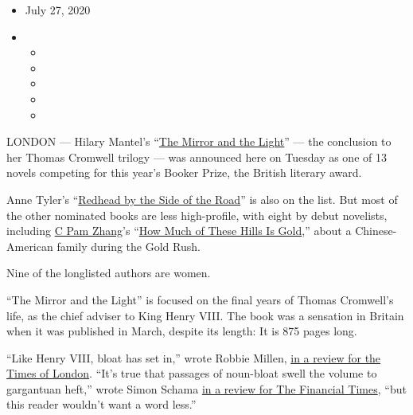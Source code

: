 \begin{itemize}
\item
  July 27, 2020
\item
  \begin{itemize}
  \item
  \item
  \item
  \item
  \item
  \end{itemize}
\end{itemize}

LONDON --- Hilary Mantel's
``\href{https://www.nytimes.com/2020/03/03/books/review-mirror-light-hilary-mantel.html}{The
Mirror and the Light}'' --- the conclusion to her Thomas Cromwell
trilogy --- was announced here on Tuesday as one of 13 novels competing
for this year's Booker Prize, the British literary award.

Anne Tyler's
``\href{https://www.nytimes.com/2020/04/07/books/review/redhead-by-the-side-of-the-road-anne-tyler.html}{Redhead
by the Side of the Road}'' is also on the list. But most of the other
nominated books are less high-profile, with eight by debut novelists,
including
\href{https://www.nytimes.com/2020/04/04/books/c-pam-zhang-how-much-of-these-hills-is-gold.html}{C
Pam Zhang}'s
``\href{https://www.nytimes.com/2020/04/07/books/review/how-much-of-these-hills-is-gold-c-pam-zhang.html}{How
Much of These Hills Is Gold},'' about a Chinese-American family during
the Gold Rush.

Nine of the longlisted authors are women.

``The Mirror and the Light'' is focused on the final years of Thomas
Cromwell's life, as the chief adviser to King Henry VIII. The book was a
sensation in Britain when it was published in March, despite its length:
It is 875 pages long.

``Like Henry VIII, bloat has set in,'' wrote Robbie Millen,
\href{https://www.thetimes.co.uk/article/the-mirror-and-the-light-by-hilary-mantel-review-5d73zvlpv}{in
a review for the Times of London}. ``It's true that passages of
noun-bloat swell the volume to gargantuan heft,'' wrote Simon Schama
\href{https://www.ft.com/content/e52e9200-57bb-11ea-a528-dd0f971febbc?accessToken=zwAAAXOQsTOYkdPlLpIAV7sR6tOlKN0Plx_rvA.MEQCIHEpEfi4JW9qMeSu48FLNSBGC9GMiUE00t5wnOiIlZutAiB3x-V2IiTLZddRbMg_NE2IUOU4ExHG0C1bv0HNsAPQBw\&sharetype=gift?token=92f7106d-6113-49a3-b937-400e0280d1e8}{in
a review for The Financial Times}, ``but this reader wouldn't want a
word less.''

